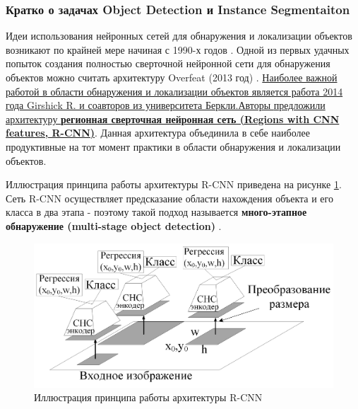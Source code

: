\documentclass[12pt]{article}
\begin{document}
\begin{sloppypar}
\subsubsection{Кратко о задачах Object Detection и Instance Segmentaiton}
Идеи использования нейронных сетей для обнаружения и локализации объектов возникают по крайней мере начиная с 1990-х годов \cite{vaillant1994original, rowley1998neural}. Одной из первых удачных попыток создания полностью сверточной нейронной сети для обнаружения объектов можно считать архитектуру Overfeat (2013 год) \cite{sermanet2013overfeat}. 
\uline{Наиболее важной работой в области обнаружения и локализации объектов является работа 2014 года \cite{girshick2014rich} Girshick R. и соавторов из университета Беркли.}\uline{Авторы \cite{girshick2014rich} предложили архитектуру \textbf{регионная сверточная нейронная сеть (Regions with CNN features, R-CNN)}}. Данная архитектура объединила в себе наиболее продуктивные на тот момент практики в области обнаружения и локализации объектов.

Иллюстрация принципа работы архитектуры R-CNN приведена на рисунке 	\ref{ch1:fig:R_CNN}. Сеть R-CNN осуществляет предсказание области нахождения объекта и его класса в два этапа - поэтому такой подход называется \textbf{много-этапное обнаружение (multi-stage object detection)} \cite{girshick2014rich}. 

    \begin{figure}[!h]
    	\begin{center}
    		\includegraphics[width=0.99\linewidth]{./figuresch1/R_CNN.png}
    		\caption{Иллюстрация  принципа работы  архитектуры R-CNN}	
    		\label{ch1:fig:R_CNN}
    	\end{center}
    \end{figure}


\end{sloppypar}
\end{document}
